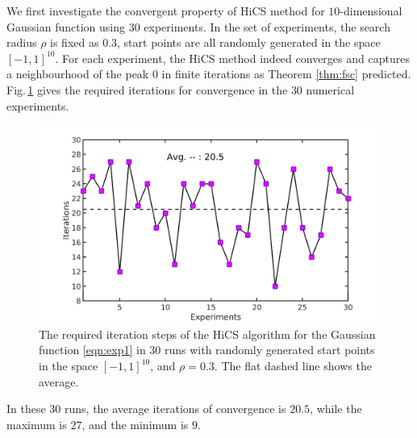\documentclass[final,1p,times]{elsarticle}
\begin{document}

We first investigate the convergent property of HiCS
method for $10$-dimensional Gaussian function using 
$30$ experiments.
In the set of experiments, the search radius $\rho$ is fixed as
$0.3$, start points are all randomly generated in the space $[-1,
1]^{10}$.  For each experiment, the HiCS method indeed converges and
captures a neighbourhood of the peak
$0$ in finite iterations as Theorem \ref{thm:fsc} predicted.
Fig.\,\ref{fig:exp1:randInit} gives the required iterations for
convergence in the $30$ numerical experiments.
\begin{figure}[!htbp]
	\centering
	  \includegraphics[scale=0.2]{../figures/gauss10Drandr0_3.png}
	  \caption{
	  The required iteration steps of the 
	  HiCS algorithm for the Gaussian function
	  \eqref{eqn:exp1} in $30$ runs with randomly generated start points
	  in the space $[-1, 1]^{10}$, and $\rho=0.3$. 
	  The flat dashed line shows the average.} 
	  \label{fig:exp1:randInit}
\end{figure}
In these $30$ runs, the average iterations of convergence is
$20.5$, while the maximum is $27$, and the minimum is $9$.

\end{document}
